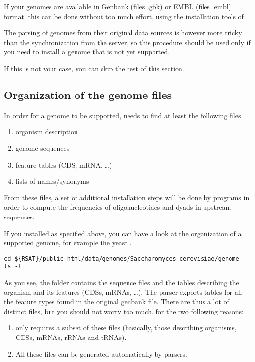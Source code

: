 If your genomes are available in Genbank (files .gbk) or EMBL (files
.embl) format, this can be done without too much effort, using the
installation tools of \RSAT. 

The parsing of genomes from their original data sources is however
more tricky than the synchronization from the \RSAT server, so this
procedure should be used only if you need to install a genome that is
not yet supported. 

If this is not your case, you can skip the rest of this section.

\subsection{Organization of the genome files}

In order for a genome to be supported, \RSAT needs to find at least
the following files.

\begin{enumerate}
\item organism description
\item genome sequences
\item feature tables (CDS, mRNA, \ldots)
\item lists of names/synonyms
\end{enumerate}

From these files, a set of additional installation steps will be done
by \RSAT programs in order to compute the frequencies of
oligonucleotides and dyads in upstream sequences.

If you installed \RSAT as specified above, you can have a look at the
organization of a supported genome, for example the yeast
.

\begin{footnotesize}
\begin{verbatim}
cd ${RSAT}/public_html/data/genomes/Saccharomyces_cerevisiae/genome
ls -l
\end{verbatim}
\end{footnotesize}

As you see, the folder  contains the sequence files and
the tables describing the organism and its features (CDSs, mRNAs,
\ldots). The \RSAT parser exports tables for all the feature types
found in the original genbank file. There are thus a lot of distinct
files, but you should not worry too much, for the two following
reasons:
\begin{enumerate}
\item \RSAT only requires a subset of these files (basically, those
  describing organisms, CDSs, mRNAs, rRNAs and tRNAs).
\item All these files can be generated automatically by \RSAT parsers.
\end{enumerate}

